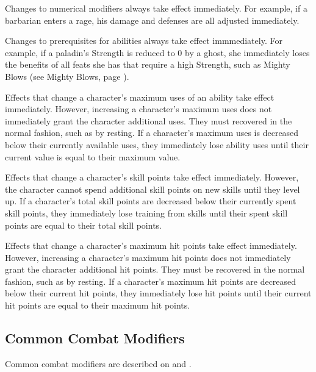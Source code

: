          Changes to numerical modifiers always take effect immediately.
        For example, if a barbarian enters a rage, his damage and defenses are all adjusted immediately.

         Changes to prerequisites for abilities always take effect immmediately.
        For example, if a paladin's Strength is reduced to 0 by a ghost, she immediately loses the benefits of all feats she has that require a high Strength, such as Mighty Blows (see Mighty Blows, page ).

         Effects that change a character's maximum uses of an ability take effect immediately.
        However, increasing a character's maximum uses does not immediately grant the character additional uses.
        They must recovered in the normal fashion, such as by resting.
        If a character's maximum uses is decreased below their currently available uses, they immediately lose ability uses until their current value is equal to their maximum value.

         Effects that change a character's skill points take effect immediately.
        However, the character cannot spend additional skill points on new skills until they level up.
        If a character's total skill points are decreased below their currently spent skill points, they immediately lose training from skills until their spent skill points are equal to their total skill points.

         Effects that change a character's maximum hit points take effect immediately.
        However, increasing a character's maximum hit points does not immediately grant the character additional hit points.
        They must be recovered in the normal fashion, such as by resting.
        If a character's maximum hit points are decreased below their current hit points, they immediately lose hit points until their current hit points are equal to their maximum hit points.

    \subsection{Common Combat Modifiers}

        Common combat modifiers are described on  and .

